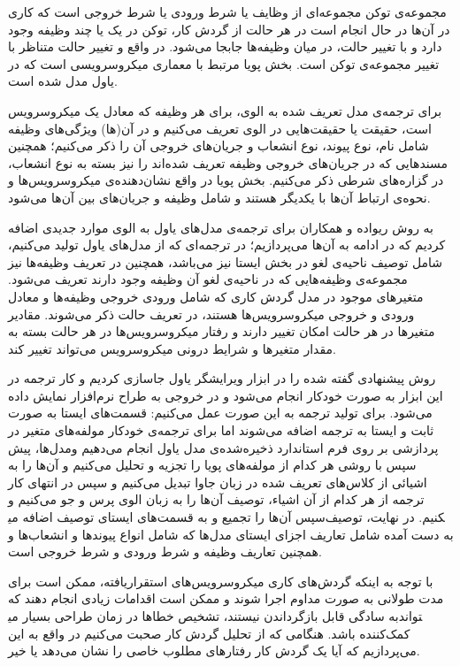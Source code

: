 مجموعه‌ی توکن مجموعه‌ای از وظایف یا شرط ورودی یا شرط خروجی است که کاری در آن‌ها در حال انجام است در هر حالت از گردش کار، توکن در یک یا چند وظیفه وجود دارد و با تغییر حالت، در میان وظیفه‌ها جابجا می‌شود. در واقع و تغییر حالت متناظر با تغییر مجموعه‌ی توکن است. 
بخش پویا مرتبط با معماری میکروسرویسی است که در یاول مدل شده است. 

برای ترجمه‌ی مدل تعریف شده به الوی، برای هر وظیفه که معادل یک میکروسرویس است، حقیقت یا حقیقت‌هایی در الوی تعریف می‌کنیم و در آن(ها) ویژگی‌های وظیفه شامل نام، نوع پیوند، نوع انشعاب و جریان‌های خروجی آن را ذکر می‌کنیم؛ 
همچنین مسندهایی که در جریان‌های خروجی وظیفه تعریف شده‌اند را نیز بسته به نوع انشعاب، در گزاره‌های شرطی ذکر می‌کنیم. 
بخش‌ پویا در واقع نشان‌دهنده‌ی میکروسرویس‌ها و نحوه‌ی ارتباط آن‌ها با یکدیگر هستند و شامل وظیفه و جریان‌های بین آن‌ها می‌شود.
 
به روش ریواده و همکاران برای ترجمه‌ی مدل‌های یاول به الوی موارد جدیدی اضافه کردیم که در ادامه به آن‌ها می‌پردازیم؛ در ترجمه‌ای که از مدل‌های یاول تولید می‌کنیم، شامل توصیف ناحیه‌ی لغو در بخش ایستا نیز می‌باشد، 
همچنین در تعریف وظیفه‌ها نیز مجموعه‌ی وظیفه‌هایی که در ناحیه‌ی لغو آن وظیفه وجود دارند تعریف می‌شود. 
متغیرهای موجود در مدل گردش کاری که شامل ورودی خروجی وظیفه‌ها و معادل ورودی و خروجی میکروسرویس‌ها هستند، در تعریف حالت ذکر می‌شوند. 
مقادیر متغیرها در هر حالت امکان تغییر دارند و رفتار میکروسرویس‌ها در هر حالت بسته به مقدار متغیرها و شرایط درونی میکروسرویس می‌تواند تغییر کند.


روش پیشنهادی گفته شده را در ابزار ویرایشگر یاول جاسازی کردیم و کار ترجمه در این ابزار به صورت خودکار انجام می‌شود و در خروجی به طراح نرم‌افزار نمایش داده می‌شود. برای تولید ترجمه به این صورت عمل می‌کنیم: قسمت‌های ایستا به صورت ثابت و ایستا به ترجمه اضافه می‌شوند اما برای ترجمه‌ی خودکار مولفه‌های متغیر در مدل‌ها، پیش‌‎پردازشی بر روی فرم استاندارد ذخیره‌شده‌ی مدل‌ یاول انجام می‌دهیم و سپس با روشی هر کدام از مولفه‌های پویا را تجزیه و تحلیل می‌کنیم و آن‌ها را به اشیائی از کلاس‌های تعریف شده در زبان جاوا تبدیل می‌کنیم و سپس در انتهای کار ترجمه از هر کدام از آن اشیاء، توصیف آن‌ها را به زبان الوی پرس و جو می‌کنیم و سپس آن‌ها را تجمیع و به قسمت‌های ایستای توصیف اضافه می‎کنیم. در نهایت، توصیف به دست آمده شامل تعاریف اجزای ایستای مدل‌ها که شامل انواع پیوندها و انشعاب‌ها و همچنین تعاریف وظیفه و شرط ورودی و شرط خروجی است.


با توجه به اینکه گردش‌های کاری میکروسرویس‌های استقراریافته، ممکن است برای مدت طولانی به صورت مداوم اجرا شوند و ممکن است اقدامات زیادی انجام دهند که به سادگی قابل بازگرداندن نیستند، تشخیص خطاها در زمان طراحی بسیار می‎تواند کمک‌کننده باشد. هنگامی که از تحلیل گردش کار صحبت می‌کنیم در واقع به این می‌پردازیم که آیا یک گردش کار رفتارهای مطلوب خاصی را نشان می‌دهد یا خیر. 

